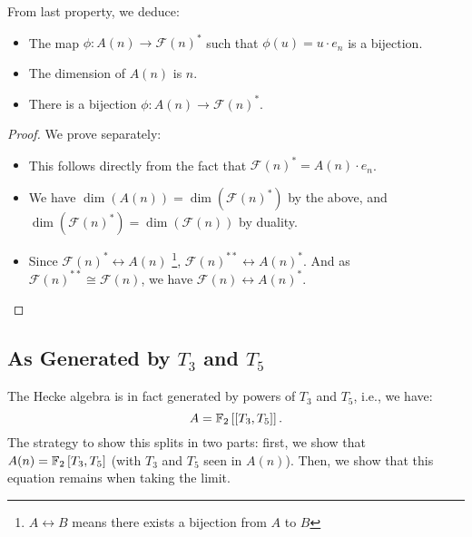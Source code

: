 \begin{corollary}
	From last property, we deduce:
	\begin{itemize}
		\item The map $\phi: A(n) \to \mathcal{F}(n)^*$ such that $\phi(u) = u \cdot e_n$ is a bijection.
		\item The dimension of $A(n)$ is $n$.
		\item There is a bijection $\phi: A(n) \to \mathcal{F}(n)^*$.
	\end{itemize}
\end{corollary}
\begin{proof}
	We prove separately:
	\begin{itemize}
		\item This follows directly from the fact that $\mathcal{F}(n)^* = A(n) \cdot e_n$.
		\item We have $\dim(A(n)) = \dim(\mathcal{F}(n)^*)$ by the above, and $\dim(\mathcal{F}(n)^*) = \dim(\mathcal{F}(n))$ by duality.
		\item Since $\mathcal{F}(n)^* \leftrightarrow A(n)$
		\footnote{$A \leftrightarrow B$ means there exists a bijection from $A$ to $B$}, $\mathcal{F}(n)^{**} \leftrightarrow A(n)^*$.
		And as $\mathcal{F}(n)^{**} \cong \mathcal{F}(n)$, we have $\mathcal{F}(n) \leftrightarrow A(n)^*$.
	\end{itemize}
\end{proof}



\subsection{As Generated by $T_3$ and $T_5$}
The Hecke algebra is in fact generated by powers of $T_3$ and $T_5$, i.e., we have:
$$
A = \mathbb{F}_2 \left[\left[ T_3, T_5 \right]\right] .
$$
The strategy to show this splits in two parts:
first, we show that $A(n) = \mathbb{F}_2 \left[ T_3, T_5 \right]$ (with $T_3$ and $T_5$ seen in $A(n)$).
Then, we show that this equation remains when taking the limit.

